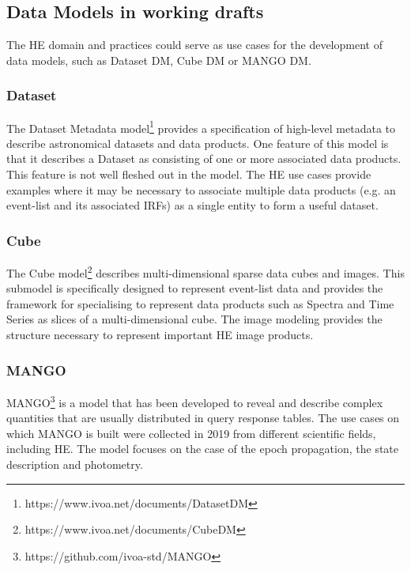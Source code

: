 \documentclass[11pt,a4paper]{ivoa}
\begin{document}
{\subsection{Data Models in working drafts}

The \gls{HE} domain and practices could serve as use cases for the development of data models, such as Dataset DM, Cube DM or MANGO DM.

\subsubsection{Dataset}

The Dataset Metadata model\footnote{https://www.ivoa.net/documents/DatasetDM} provides a specification of high-level metadata to describe astronomical datasets and data products.
One feature of this model is that it describes a Dataset as consisting of one or more associated data products.  This feature is not
well fleshed out in the model.  The \gls{HE} use cases provide examples where it may be necessary to associate multiple data products
(e.g. an event-list and its associated \gls{IRF}s) as a single entity to form a useful dataset.

\subsubsection{Cube}

The Cube model\footnote{https://www.ivoa.net/documents/CubeDM} describes multi-dimensional sparse data cubes and images.  This submodel is specifically designed to
represent event-list data and provides the framework for specialising to represent data products such as Spectra and Time Series
as slices of a multi-dimensional cube.  The image modeling provides the structure necessary to represent important \gls{HE} image products.

\subsubsection{MANGO}

MANGO\footnote{https://github.com/ivoa-std/MANGO} is a model that has been developed to reveal
and describe complex quantities that are usually distributed in query response tables.
The use cases on which MANGO is built were collected in 2019 from different scientific fields, including \gls{HE}.
The model focuses on the case of the epoch propagation, the state description and photometry.

}
\end{document}
